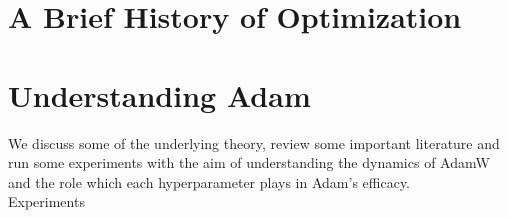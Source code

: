 \documentclass[12pt]{book}
\begin{document}
\begin{comment}
The step implementation in SGD looks something like
\begin{verbatim}
    for i, param in enumerate(params):
        grad = grads[i] if not maximize else -grads[i]
        if weight_decay != 0:
            grad = grad.add(param, alpha=weight_decay)
        if momentum != 0:
            buf = momentum_buffer_list[i]
            if buf is None:
                buf = torch.clone(grad).detach()
                momentum_buffer_list[i] = buf
            else:
                buf.mul_(momentum).add_(grad, alpha=1 - dampening)
            if nesterov:
                grad = grad.add(buf, alpha=momentum)
            else:
                grad = buf
        param.add_(grad, alpha=-lr)
\end{verbatim}
First of all, dampening isn't used in adamw so it's not really an exponential moving average of the same form. the default implementation is with dampening = 0 and this then means most recent update is way way larger than in momentum part of AdamW. I guess it's equivalent up to scaling
\\
But even ignoring this, the thing I'm more confused by is how the weight decay mechanism is added...
So basically, let $\beta = \text{weight decay}$, $\gamma = \text{dampening}$,  $\eta_t, \lambda $ learning rate and wd terms and $w_t, g_t$ the weights and gradients at time $t$
Then in the AdamW implementation, the weight decay is applied directly to the parameters and then the update:
\[
	w_t = (1-\eta_t \lambda ) w_{t-1} - \eta_t \frac{m_t}{\sqrt{v_t} + \varepsilon } \quad \text{and} \quad m_t = \beta_1 m_{t-1} + (1-\beta_1)g_t
\]
... makes sense\\

however the wd update insists 
\begin{align*}
	g_t &= g_t + \lambda w_t \\
\end{align*}



\end{comment}

\chapter{A Brief History of Optimization}






\chapter{Understanding Adam}
\label{chap: Understanding Adam}
We discuss some of the underlying theory, review some important literature and run some experiments with the aim of understanding the dynamics of AdamW and the role which each hyperparameter plays in Adam's efficacy.\\
Experiments 
\end{document}
